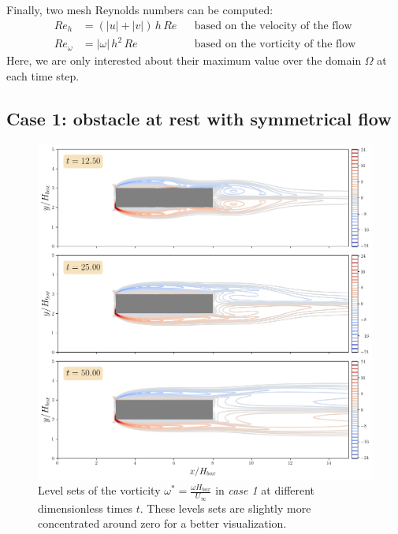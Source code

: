 \documentclass[11 pt]{article}
\begin{document}
Finally, two mesh Reynolds numbers can be computed:
\begin{align}
    Re_h &= (|u|+|v|) \,h \, Re && \text{based on the velocity of the flow}\\
    Re_{\omega} &= |\omega| \,h^2 \, Re && \text{based on the vorticity of the flow}
\end{align}
Here, we are only interested about their maximum value over the domain $\Omega$ at each time step.



\subsection{Case 1: obstacle at rest with symmetrical flow}

\begin{figure}[H]
    \centering
    \includegraphics[width=\textwidth]{../figures/vorticity_case_1.png}
    \caption{Level sets of the vorticity $\omega^* = \frac{\omega H_{box}}{U_{\infty}}$ in \textit{case 1} at different dimensionless times $t$. These levels sets are slightly more concentrated around zero for a better visualization.}
    \label{fig:vorticity_1}
\end{figure}
\end{document}
